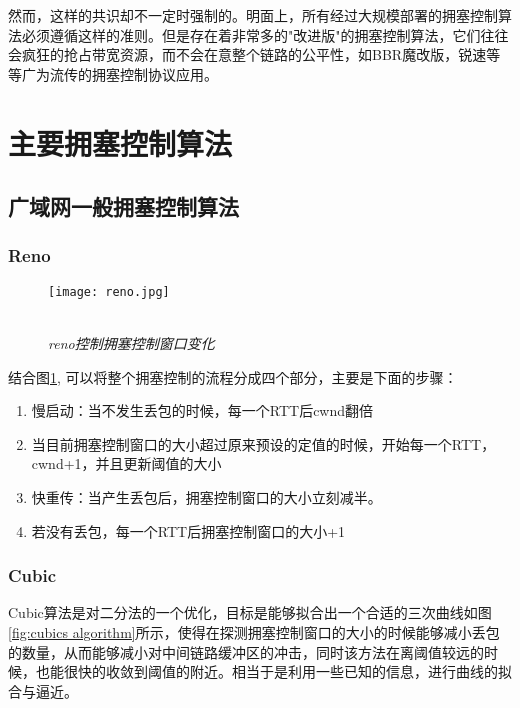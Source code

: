 \documentclass[a4paper, 12pt, UTF8]{ctexart}
\begin{document}
\par 然而，这样的共识却不一定时强制的。明面上，所有经过大规模部署的拥塞控制算法必须遵循这样的准则。但是存在着非常多的"改进版"的拥塞控制算法，它们往往会疯狂的抢占带宽资源，而不会在意整个链路的公平性，如BBR魔改版，锐速等等\cite{linux-netspeed}广为流传的拥塞控制协议应用。

\clearpage

\section{主要拥塞控制算法}

\subsection{广域网一般拥塞控制算法}

\subsubsection{Reno}
\begin{figure}[H]
	\centering \texttt{[image: reno.jpg]}
	\\ \hspace*{\fill} \\
	\caption{\em reno控制拥塞控制窗口变化}
	\label{fig:reno algorithm}
\end{figure}
\par 结合图\ref{fig:reno algorithm}, 可以将整个拥塞控制的流程分成四个部分，主要是下面的步骤：
\begin{enumerate}
	\item 慢启动：当不发生丢包的时候，每一个RTT后cwnd翻倍
	\item 当目前拥塞控制窗口的大小超过原来预设的定值的时候，开始每一个RTT，cwnd+1，并且更新阈值的大小
	\item 快重传：当产生丢包后，拥塞控制窗口的大小立刻减半。
	\item 若没有丢包，每一个RTT后拥塞控制窗口的大小+1
\end{enumerate}


\subsubsection{Cubic}
\par Cubic算法\cite{10.1145/1400097.1400105}是对二分法的一个优化，目标是能够拟合出一个合适的三次曲线如图\ref{fig:cubics algorithm}所示，使得在探测拥塞控制窗口的大小的时候能够减小丢包的数量，从而能够减小对中间链路缓冲区的冲击，同时该方法在离阈值较远的时候，也能很快的收敛到阈值的附近。相当于是利用一些已知的信息，进行曲线的拟合与逼近。
\end{document}
